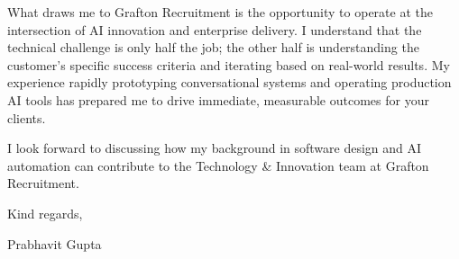 \documentclass[11pt,a4paper]{article}
\begin{document}
What draws me to Grafton Recruitment is the opportunity to operate at the intersection of AI innovation and enterprise delivery. I understand that the technical challenge is only half the job; the other half is understanding the customer's specific success criteria and iterating based on real-world results. My experience rapidly prototyping conversational systems and operating production AI tools has prepared me to drive immediate, measurable outcomes for your clients.

I look forward to discussing how my background in software design and AI automation can contribute to the Technology \& Innovation team at Grafton Recruitment.

Kind regards,

Prabhavit Gupta
\end{document}
